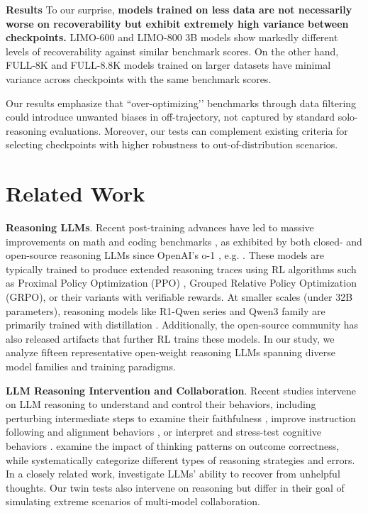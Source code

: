 \documentclass{article} %
\begin{document}
\textbf{Results} 
To our surprise, \textbf{models trained on less data are not necessarily worse on recoverability but exhibit extremely high variance between checkpoints.} LIMO-600 and LIMO-800 3B models show markedly different levels of recoverability against similar benchmark scores. On the other hand, FULL-8K and FULL-8.8K models trained on larger datasets have minimal variance across checkpoints with the same benchmark scores. 

Our results emphasize that ``over-optimizing’’ benchmarks through data filtering could introduce unwanted biases in off-trajectory, not captured by standard solo-reasoning evaluations. Moreover, our tests can complement existing criteria for selecting checkpoints with higher robustness to out-of-distribution scenarios.

\section{Related Work}
\label{sec:background}
\textbf{Reasoning LLMs}. Recent post-training advances have led to massive improvements on math and coding benchmarks \citep{huang2025gemini, guo2025deepseek}, as exhibited by both closed- and open-source reasoning LLMs since OpenAI's o-1 \citep{jaech2024openai}, e.g. \cite{guo2025deepseek,yang2025qwen3,guha2025openthoughts, ye2025limoreasoning,ji2025thinking}. These models are typically trained to produce extended reasoning traces using RL algorithms such as Proximal Policy Optimization (PPO) \citep{schulman2017proximal}, Grouped Relative Policy Optimization (GRPO), or their variants \citep{shao2024deepseekmath} with verifiable rewards.
At smaller scales (under 32B parameters), reasoning models like R1-Qwen series \citep{guo2025deepseek} and Qwen3 family \citep{yang2025qwen3} are primarily trained with distillation \citep{hinton2015distilling}. Additionally, the open-source community has also released artifacts that further RL trains these models. In our study, we analyze fifteen representative open-weight reasoning LLMs spanning diverse model families and training paradigms.

\textbf{LLM Reasoning Intervention and Collaboration}. Recent studies intervene on LLM reasoning to understand and control their behaviors, including perturbing intermediate steps to examine their faithfulness \citep{arcuschin2025chain, baker2025monitoring}, improve instruction following and alignment behaviors \citep{wu2025effectively}, or interpret \citep{lee2025cot, marjanovic2025deepseek} and stress-test cognitive behaviors \citep{gandhi2025cognitive}. \cite{wen2025thinkpatterns} examine the impact of thinking patterns on outcome correctness, while \cite{he2025can, lee2025cot} systematically categorize different types of reasoning strategies and errors. In a closely related work, \cite{he2025can} investigate LLMs' ability to recover from unhelpful thoughts. Our twin tests also intervene on reasoning but differ in their goal of simulating extreme scenarios of multi-model collaboration.
\end{document}

